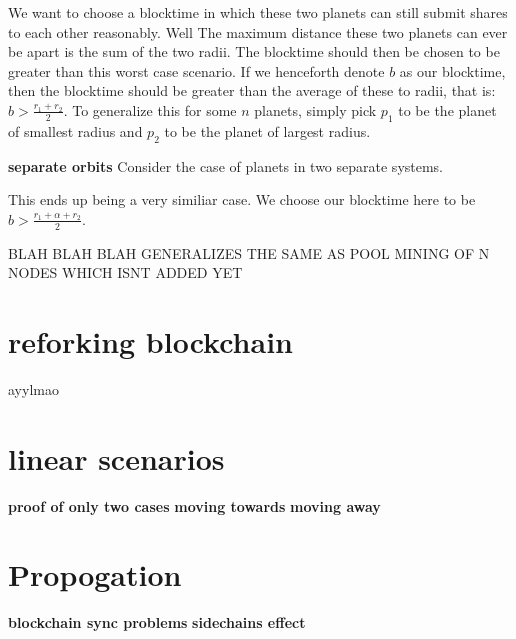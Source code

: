 \documentclass[conference]{IEEEtran}
\begin{document}
We want to choose a blocktime in which these two planets can still submit shares to each other reasonably. Well The maximum distance these two planets can ever be apart is the sum of the two radii. The blocktime should then be chosen to be greater than this worst case scenario. If we henceforth denote $b$ as our blocktime, then the blocktime should be greater than the average of these to radii, that is: $b > \frac{r_1+r_2}{2}$. To generalize this for some $n$ planets, simply pick $p_1$ to be the planet of smallest radius and $p_2$ to be the planet of largest radius.

\textbf{separate orbits}
Consider the case of planets in two separate systems.
\begin{center}
\end{center}

This ends up being a very similiar case. We choose our blocktime here to be $b > \frac{r_1 + \alpha + r_2}{2}$.

BLAH BLAH BLAH GENERALIZES THE SAME AS POOL MINING OF N NODES WHICH ISNT ADDED YET


\section{reforking blockchain}
ayylmao

\section{linear scenarios}
\textbf{proof of only two cases}
\lipsum[1-2]
\textbf{moving towards}
\lipsum[1-3]
\textbf{moving away}
\lipsum[1-3]
\section{Propogation}
\textbf{blockchain sync problems}
\lipsum[1-2]
\textbf{sidechains effect}
\lipsum[1-2]
\end{document}
